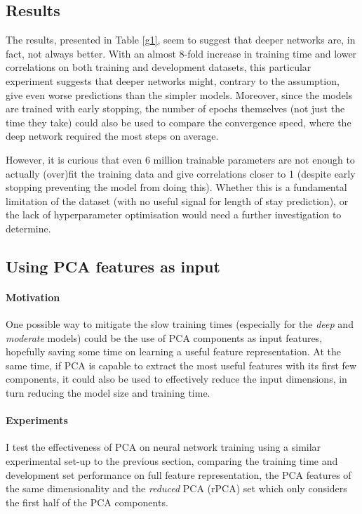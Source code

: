 \documentclass[10pt, twocolumn]{article}
\begin{document}
\subsection{Results}
The results, presented in Table \ref{g1}, seem to suggest that deeper networks are, in fact, not always better. With an almost 8-fold increase in training time and lower correlations on both training and development datasets, this particular experiment suggests that deeper networks might, contrary to the assumption, give even worse predictions than the simpler models. Moreover, since the models are trained with early stopping, the number of epochs themselves (not just the time they take) could also be used to compare the convergence speed, where the deep network required the most steps on average.

However, it is curious that even 6 million trainable parameters are not enough to actually (over)fit the training data and give correlations closer to 1 (despite early stopping preventing the model from doing this). Whether this is a fundamental limitation of the dataset (with no useful signal for length of stay prediction), or the lack of hyperparameter optimisation would need a further investigation to determine.

\subsection{Using PCA features as input}
\paragraph{Motivation} One possible way to mitigate the slow training times (especially for the \textit{deep} and \textit{moderate} models) could be the use of PCA components as input features, hopefully saving some time on learning a useful feature representation. At the same time, if PCA is capable to extract the most useful features with its first few components, it could also be used to effectively reduce the input dimensions, in turn reducing the model size and training time. 

\paragraph{Experiments} I test the effectiveness of PCA on neural network training using a similar experimental set-up to the previous section, comparing the training time and development set performance on full feature representation, the PCA features of the same dimensionality and the \textit{reduced} PCA (rPCA) set which only considers the first half of the PCA components. 
\end{document}
